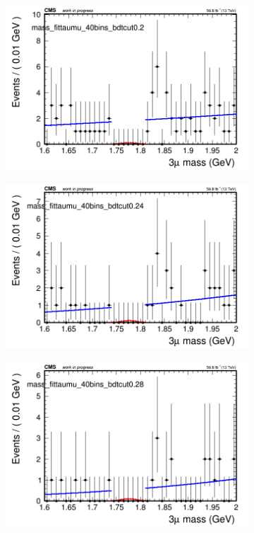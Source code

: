\begin{figure}[H]
\begin{subfigure}{0.2\textwidth}
        \includegraphics[width=\textwidth]{power_law/plots/taumu/massfit_taumu_40bins_bdtcut0.2.png}
        \caption{}
    \end{subfigure}
    \begin{subfigure}{0.2\textwidth}
        \includegraphics[width=\textwidth]{power_law/plots/taumu/massfit_taumu_40bins_bdtcut0.24.png}
        \caption{}
    \end{subfigure}
    \begin{subfigure}{0.2\textwidth}
        \includegraphics[width=\textwidth]{power_law/plots/taumu/massfit_taumu_40bins_bdtcut0.28.png}

\end{subfigure}
\end{figure}
